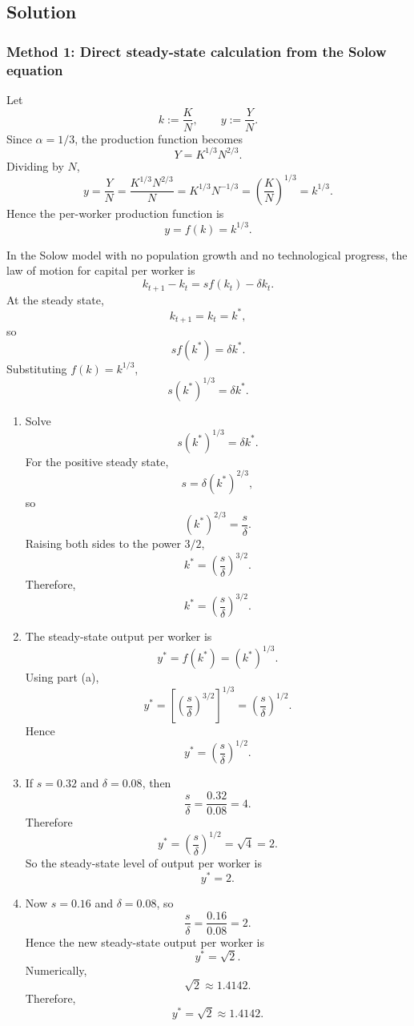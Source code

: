 \documentclass[12pt]{article}
\begin{document}
\subsection{Solution}

\subsubsection{Method 1: Direct steady-state calculation from the Solow equation}
Let
\[
k:=\frac{K}{N},
\qquad
y:=\frac{Y}{N}.
\]
Since \(\alpha=1/3\), the production function becomes
\[
Y=K^{1/3}N^{2/3}.
\]
Dividing by \(N\),
\[
y=\frac{Y}{N}=\frac{K^{1/3}N^{2/3}}{N}=K^{1/3}N^{-1/3}=\left(\frac{K}{N}\right)^{1/3}=k^{1/3}.
\]
Hence the per-worker production function is
\[
y=f(k)=k^{1/3}.
\]

In the Solow model with no population growth and no technological progress, the law of motion for capital per worker is
\[
k_{t+1}-k_t=s f(k_t)-\delta k_t.
\]
At the steady state,
\[
k_{t+1}=k_t=k^*,
\]
so
\[
s f(k^*)=\delta k^*.
\]
Substituting \(f(k)=k^{1/3}\),
\[
s(k^*)^{1/3}=\delta k^*.
\]

\begin{enumerate}[label=(\alph*)]
    \item
    Solve
    \[
    s(k^*)^{1/3}=\delta k^*.
    \]
    For the positive steady state,
    \[
    s=\delta (k^*)^{2/3},
    \]
    so
    \[
    (k^*)^{2/3}=\frac{s}{\delta}.
    \]
    Raising both sides to the power \(3/2\),
    \[
    k^*=\left(\frac{s}{\delta}\right)^{3/2}.
    \]
    Therefore,
    \[
    \boxed{k^*=\left(\frac{s}{\delta}\right)^{3/2}.}
    \]

    \item
    The steady-state output per worker is
    \[
    y^*=f(k^*)=(k^*)^{1/3}.
    \]
    Using part (a),
    \[
    y^*=\left[\left(\frac{s}{\delta}\right)^{3/2}\right]^{1/3}
    =\left(\frac{s}{\delta}\right)^{1/2}.
    \]
    Hence
    \[
    \boxed{y^*=\left(\frac{s}{\delta}\right)^{1/2}.}
    \]

    \item
    If \(s=0.32\) and \(\delta=0.08\), then
    \[
    \frac{s}{\delta}=\frac{0.32}{0.08}=4.
    \]
    Therefore
    \[
    y^*=\left(\frac{s}{\delta}\right)^{1/2}=\sqrt{4}=2.
    \]
    So the steady-state level of output per worker is
    \[
    \boxed{y^*=2.}
    \]

    \item
    Now \(s=0.16\) and \(\delta=0.08\), so
    \[
    \frac{s}{\delta}=\frac{0.16}{0.08}=2.
    \]
    Hence the new steady-state output per worker is
    \[
    y^*=\sqrt{2}.
    \]
    Numerically,
    \[
    \sqrt{2}\approx 1.4142.
    \]
    Therefore,
    \[
    \boxed{y^*=\sqrt{2}\approx 1.4142.}
    \]
\end{enumerate}
\end{document}
